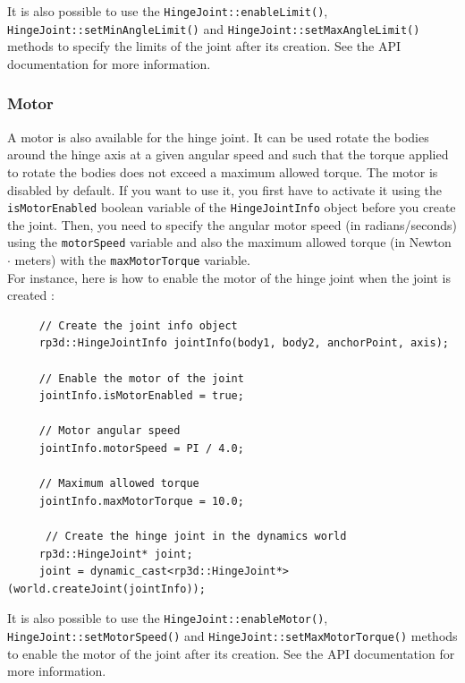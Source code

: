 \documentclass[a4paper,12pt]{article}
\begin{document}
     \begin{sloppypar}
        It is also possible to use the \texttt{HingeJoint::enableLimit()}, \texttt{HingeJoint::setMinAngleLimit()} and \texttt{HingeJoint::setMaxAngleLimit()} methods to specify
        the limits of the joint after its creation. See the API documentation for more information.
     \end{sloppypar}

     \subsubsection{Motor}

     A motor is also available for the hinge joint. It can be used rotate the bodies around the hinge axis at a given angular speed and such that the torque applied to
     rotate the bodies does not exceed a maximum allowed torque. The motor is disabled by default. If you want to use it, you first have to activate it using the
     \texttt{isMotorEnabled} boolean variable of the \texttt{HingeJointInfo} object before you create the joint. Then, you need to specify the angular motor speed (in radians/seconds)
     using the \texttt{motorSpeed} variable and also the maximum allowed torque (in Newton $\cdot$ meters) with the \texttt{maxMotorTorque} variable. \\

     For instance, here is how to enable the motor of the hinge joint when the joint is created : \\

     \begin{lstlisting}
     // Create the joint info object
     rp3d::HingeJointInfo jointInfo(body1, body2, anchorPoint, axis);

     // Enable the motor of the joint
     jointInfo.isMotorEnabled = true;

     // Motor angular speed
     jointInfo.motorSpeed = PI / 4.0;

     // Maximum allowed torque
     jointInfo.maxMotorTorque = 10.0;

      // Create the hinge joint in the dynamics world
     rp3d::HingeJoint* joint;
     joint = dynamic_cast<rp3d::HingeJoint*>(world.createJoint(jointInfo));
  \end{lstlisting}

     \vspace{0.6cm}

     \begin{sloppypar}
        It is also possible to use the \texttt{HingeJoint::enableMotor()}, \texttt{HingeJoint::setMotorSpeed()} and \texttt{HingeJoint::setMaxMotorTorque()} methods to
        enable the motor of the joint after its creation. See the API documentation for more information.
     \end{sloppypar}
\end{document}
